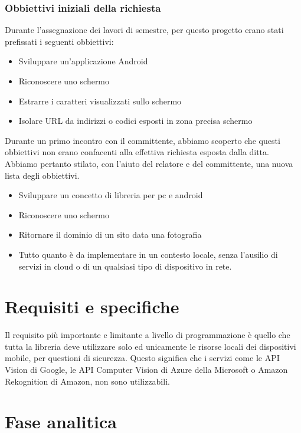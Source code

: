 \documentclass[twoside]{supsistudent}
\begin{document}
\subsection{Obbiettivi iniziali della richiesta}
Durante l’assegnazione dei lavori di semestre, per questo progetto erano stati prefissati i seguenti obbiettivi:

\begin{itemize}
\item Sviluppare un'applicazione Android
\item Riconoscere uno schermo
\item Estrarre i caratteri visualizzati sullo schermo
\item Isolare URL da indirizzi o codici esposti in zona precisa schermo

\end{itemize}

Durante un primo incontro con il committente, abbiamo scoperto che questi obbiettivi non erano confacenti alla effettiva richiesta esposta dalla ditta. Abbiamo pertanto stilato, con l’aiuto del relatore e del committente, una nuova lista degli obbiettivi.

\begin{itemize}
\item Sviluppare un concetto di libreria per pc e android
\item Riconoscere uno schermo
\item Ritornare il dominio di un sito data una fotografia
\item Tutto quanto è da implementare in un contesto locale, senza l'ausilio di servizi in cloud o di un qualsiasi tipo di dispositivo in rete.
\end{itemize}

\chapter{Requisiti e specifiche} 
Il requisito più importante e limitante a livello di programmazione è quello che tutta la libreria deve utilizzare solo ed unicamente le risorse locali dei dispositivi mobile, per questioni di sicurezza. Questo significa che i servizi come le API Vision di Google, le API Computer Vision di Azure della Microsoft o Amazon Rekognition di Amazon, non sono utilizzabili.  

\chapter{Fase analitica}
\end{document}

